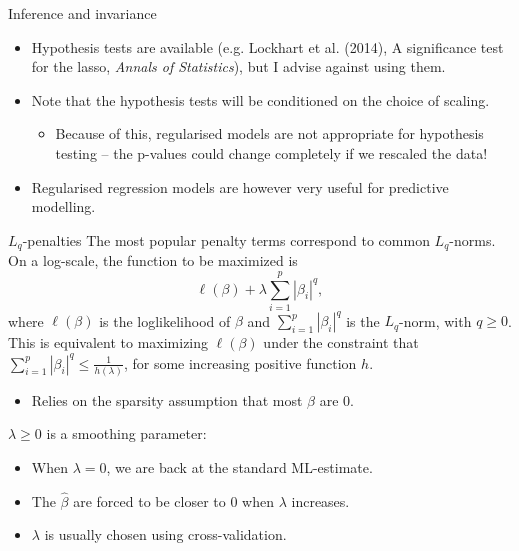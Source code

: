\documentclass[10pt,handout]{beamer}
\begin{document}
\begin{frame}{Inference and invariance}
\begin{itemize}
\item Hypothesis tests are available (e.g. Lockhart et al. (2014), A significance test for the lasso, \emph{Annals of Statistics}), but I advise against using them.\\[3mm]\pause
\item Note that the hypothesis tests will be conditioned on the choice of scaling.\pause
\begin{itemize}
\item Because of this, regularised models are not appropriate for hypothesis testing -- the p-values could change completely if we rescaled the data!\\[3mm]\pause
\end{itemize}
\item Regularised regression models are however very useful for {\color{uured}predictive modelling}.
\end{itemize}
\end{frame}

\begin{frame}{$L_q$-penalties}
The most popular penalty terms correspond to common {\color{uured}$L_q$-norms}. \pause On a log-scale, the function to be maximized is
$$\ell(\beta)+\lambda\sum_{i=1}^p|\beta_i|^q,$$
where $\ell(\beta)$ is the loglikelihood of $\beta$ and $\sum_{i=1}^p|\beta_i|^q$ is the $L_q$-norm, with $q\geq 0$.\\[3mm]\pause
This is equivalent to maximizing $\ell(\beta)$ under the constraint that $\sum_{i=1}^p|\beta_i|^q\leq\frac{1}{h(\lambda)}$, for some increasing positive function $h$.\pause
\begin{itemize}
\item Relies on the {\color{uured}sparsity} assumption that most $\beta$ are 0.\\[3mm]\pause
\end{itemize}
$\lambda\geq 0$ is a {\color{uured}smoothing parameter}:
\begin{itemize}
\item When $\lambda=0$, we are back at the standard ML-estimate.
\item The $\hat{\beta}$ are forced to be closer to 0 when $\lambda$ increases.
\item $\lambda$ is usually chosen using cross-validation.
\end{itemize}
\end{frame}
\end{document}
